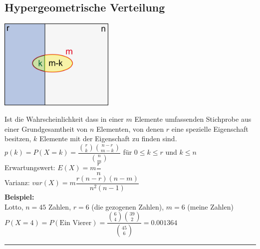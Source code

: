 	\subsection{Hypergeometrische Verteilung }
	    \begin{floatingfigure}[r]{5.5cm}
        	\includegraphics[width=5.5cm]{./bilder/hypergeo.png}
        \end{floatingfigure}
        Ist die Wahrscheinlichkeit dass in einer $m$ Elemente umfassenden 
		Stichprobe aus einer Grundgesamtheit von $n$ Elementen, von denen $r$ eine
		spezielle Eigenschaft besitzen, $k$ Elemente mit der Eigenschaft zu
		finden sind.\\
		\vspace{5mm} 
		$p(k)=P(X=k)=\dfrac{\binom r k \binom{n-r}{m-k}}{\binom n m}$ 
        \hspace{10mm} für $0\leq k \leq r$ und $k \leq n$\\
        Erwartungswert: \hspace{10mm} $E(X)=m \dfrac{r}{n}$\\
        Varianz: \hspace{22mm} $var(X)=m \dfrac{r(n-r)(n-m)}{n^2(n-1)}$ \\
		{\bf Beispiel:} \\
		Lotto, $n=45$ Zahlen, $r=6$ (die gezogenen Zahlen), $m=6$
		(meine Zahlen) \\
		$P(X=4)=P(\text{Ein Vierer})=\dfrac{\binom 6 4 \binom {39}
		2}{\binom {45} 6}=0.001364$	\\

\hrule \hspace{3mm}

